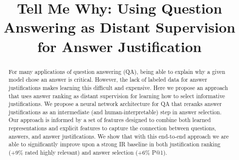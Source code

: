 \documentclass[11pt,letterpaper]{article}
\title{Tell Me Why: Using Question Answering as Distant Supervision for Answer Justification}
\date{}
\begin{document}
\maketitle

\begin{abstract}

For many applications of question answering (QA), being able to explain why a given model chose an answer is critical.  However, the lack of labeled data for  answer justifications makes learning this difficult and expensive.  Here we propose an approach that uses answer ranking as distant supervision for learning how to select informative justifications. 
We propose a neural network architecture for QA that reranks answer justifications as an intermediate (and human-interpretable) step in answer selection. Our approach is informed by a set of features designed to combine both learned representations and explicit features to capture the connection between questions, answers, and answer justifications.
 We show that with this end-to-end approach we are able to significantly improve upon a strong IR baseline in both justification ranking (+9\% rated highly relevant) and answer selection (+6\% P@1).  %
\end{abstract}









\FloatBarrier





\end{document}
